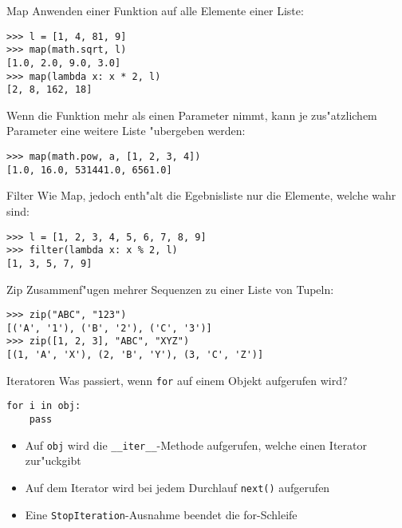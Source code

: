 \begin{frame}[fragile]{Map}
Anwenden einer Funktion auf alle Elemente einer Liste:
\begin{lstlisting}[style=Shell]
>>> l = [1, 4, 81, 9]
>>> map(math.sqrt, l)
[1.0, 2.0, 9.0, 3.0]
>>> map(lambda x: x * 2, l)
[2, 8, 162, 18]
\end{lstlisting}
Wenn die Funktion mehr als einen Parameter nimmt, kann je zus"atzlichem Parameter eine weitere Liste "ubergeben werden:
\begin{lstlisting}[style=Shell]
>>> map(math.pow, a, [1, 2, 3, 4])
[1.0, 16.0, 531441.0, 6561.0]
\end{lstlisting}
\end{frame} 

\begin{frame}[fragile]{Filter}
Wie Map, jedoch enth"alt die Egebnisliste nur die Elemente, welche wahr sind:
\begin{lstlisting}[style=Shell]
>>> l = [1, 2, 3, 4, 5, 6, 7, 8, 9]
>>> filter(lambda x: x % 2, l)
[1, 3, 5, 7, 9]
\end{lstlisting}
\end{frame} 

\begin{frame}[fragile]{Zip}
Zusammenf"ugen mehrer Sequenzen zu einer Liste von Tupeln:
\begin{lstlisting}[style=Shell]
>>> zip("ABC", "123")
[('A', '1'), ('B', '2'), ('C', '3')]
>>> zip([1, 2, 3], "ABC", "XYZ")
[(1, 'A', 'X'), (2, 'B', 'Y'), (3, 'C', 'Z')]
\end{lstlisting}
\end{frame}


\begin{frame}[fragile]{Iteratoren}
Was passiert, wenn \lstinline{for} auf einem Objekt aufgerufen wird?
\begin{lstlisting}[style=Python]
for i in obj:
    pass
\end{lstlisting}
\begin{itemize}
\item Auf \lstinline{obj} wird die \lstinline{__iter__}-Methode aufgerufen, welche einen \alert{Iterator} zur"uckgibt
\item Auf dem Iterator wird bei jedem Durchlauf \alert{\lstinline{next()}} aufgerufen
\item Eine \lstinline{StopIteration}-Ausnahme beendet die for-Schleife
\end{itemize}
\end{frame}

